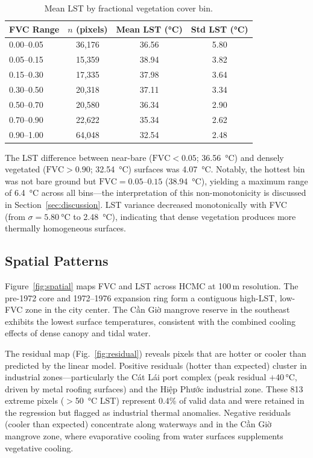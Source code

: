 \documentclass[preprint,12pt]{elsarticle}
\begin{document}
\begin{table}[htbp]
\centering
\caption{Mean LST by fractional vegetation cover bin.}
\label{tab:bins}
\begin{tabular}{lccc}
\toprule
FVC Range & $n$ (pixels) & Mean LST (\si{\degreeCelsius}) & Std LST (\si{\degreeCelsius}) \\
\midrule
0.00--0.05 & 36{,}176 & 36.56 & 5.80 \\
0.05--0.15 & 15{,}359 & 38.94 & 3.82 \\
0.15--0.30 & 17{,}335 & 37.98 & 3.64 \\
0.30--0.50 & 20{,}318 & 37.11 & 3.34 \\
0.50--0.70 & 20{,}580 & 36.34 & 2.90 \\
0.70--0.90 & 22{,}622 & 35.34 & 2.62 \\
0.90--1.00 & 64{,}048 & 32.54 & 2.48 \\
\bottomrule
\end{tabular}
\end{table}

The LST difference between near-bare ($\text{FVC} < 0.05$; \SI{36.56}{\degreeCelsius}) and densely vegetated ($\text{FVC} > 0.90$; \SI{32.54}{\degreeCelsius}) surfaces was \SI{4.07}{\degreeCelsius}. Notably, the hottest bin was not bare ground but $\text{FVC} = 0.05$--$0.15$ (\SI{38.94}{\degreeCelsius}), yielding a maximum range of \SI{6.4}{\degreeCelsius} across all bins---the interpretation of this non-monotonicity is discussed in Section~\ref{sec:discussion}. LST variance decreased monotonically with FVC (from $\sigma = \SI{5.80}{\degreeCelsius}$ to \SI{2.48}{\degreeCelsius}), indicating that dense vegetation produces more thermally homogeneous surfaces.

\subsection{Spatial Patterns}

Figure~\ref{fig:spatial} maps FVC and LST across HCMC at 100\,m resolution. The pre-1972 core and 1972--1976 expansion ring form a contiguous high-LST, low-FVC zone in the city center. The Cần Giờ mangrove reserve in the southeast exhibits the lowest surface temperatures, consistent with the combined cooling effects of dense canopy and tidal water.

The residual map (Fig.~\ref{fig:residual}) reveals pixels that are hotter or cooler than predicted by the linear model. Positive residuals (hotter than expected) cluster in industrial zones---particularly the Cát Lái port complex (peak residual $+$40\,\si{\degreeCelsius}, driven by metal roofing surfaces) and the Hiệp Phước industrial zone. These 813 extreme pixels ($>$\SI{50}{\degreeCelsius} LST) represent 0.4\% of valid data and were retained in the regression but flagged as industrial thermal anomalies. Negative residuals (cooler than expected) concentrate along waterways and in the Cần Giờ mangrove zone, where evaporative cooling from water surfaces supplements vegetative cooling.
\end{document}
